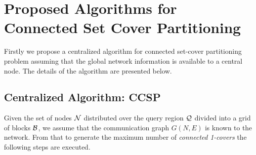 \documentclass{acm_proc_article-sp}
\begin{document}
\section{Proposed Algorithms for Connected Set Cover Partitioning}
\label{sec_3}
\vspace{0.3cm}
Firstly we propose a centralized algorithm for connected set-cover partitioning problem assuming that the global network information is available to a central node. The details of the algorithm are presented below.
\vspace{-0.3cm}
  \subsection{\bf Centralized Algorithm: CCSP}
Given the set of nodes ${\cal N}$ distributed over the query region ${\cal Q}$ divided into a grid of blocks ${\cal B}$, we assume that the communication graph $G(N,E)$ is known to the network. From that to generate the maximum number of {\it connected 1-covers} the following steps are executed. 
\end{document}
